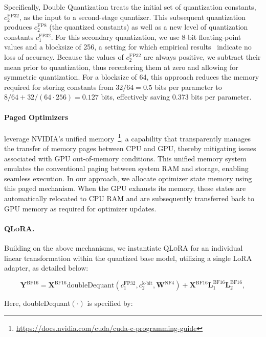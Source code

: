 Specifically, Double Quantization treats the initial set of quantization constants, $c_2^{\text{FP32}}$, as the input to a second-stage quantizer. This subsequent quantization produces $c_2^{\text{FP8}}$ (the quantized constants) as well as a new level of quantization constants $c_1^{\text{FP32}}$. For this secondary quantization, we use 8-bit floating-point values and a blocksize of 256, a setting for which empirical results~\citep{dettmers2022case} indicate no loss of accuracy. Because the values of $c_2^{\text{FP32}}$ are always positive, we subtract their mean prior to quantization, thus recentering them at zero and allowing for symmetric quantization. For a blocksize of 64, this approach reduces the memory required for storing constants from $32/64 = 0.5$ bits per parameter to $8/64 + 32/(64\cdot256) = 0.127$ bits, effectively saving 0.373 bits per parameter.

\paragraph{Paged Optimizers} leverage NVIDIA's unified memory~\footnote{\tiny \url{https://docs.nvidia.com/cuda/cuda-c-programming-guide}}, a capability that transparently manages the transfer of memory pages between CPU and GPU, thereby mitigating issues associated with GPU out-of-memory conditions. This unified memory system emulates the conventional paging between system RAM and storage, enabling seamless execution. In our approach, we allocate optimizer state memory using this paged mechanism. When the GPU exhausts its memory, these states are automatically relocated to CPU RAM and are subsequently transferred back to GPU memory as required for optimizer updates.

\paragraph{\textsc{QLoRA}.} Building on the above mechanisms, we instantiate \textsc{QLoRA} for an individual linear transformation within the quantized base model, utilizing a single LoRA adapter, as detailed below:

\begin{equation}
    \mathbf{Y}^{\text{BF16}} =  \mathbf{X}^{\text{BF16}} \text{doubleDequant}(c_1^{\text{FP32}}, c_2^{\text{k-bit}}, \mathbf{W}^{\text{NF4}}) + \mathbf{X}^{\text{BF16}}\mathbf{L}^{\text{BF16}}_1\mathbf{L}^{\text{BF16}}_2,
\end{equation}

Here, doubleDequant$(\cdot)$ is specified by:

